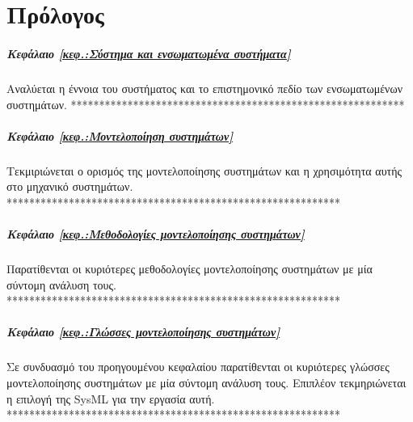 \documentclass[a4paper,12pt,twoside]{report}
\begin{document}
\pagestyle{fancy}
\fancyhf{}
\renewcommand{\chaptermark}[1]{\markboth{ \emph{#1}}{}}

\fancyhead[RE]{\leftmark}
\fancyfoot[LE,RO]{\thepage}



	\newpage
	\chapter*{Πρόλογος}
		
		\paragraph{Κεφάλαιο \ref{κεφ.:Σύστημα και ενσωματωμένα συστήματα}} {Αναλύεται η έννοια του συστήματος και το επιστημονικό πεδίο των ενσωματωμένων συστημάτων.\cite{SMSpacecraft}
		***********************************************************
		}
		\paragraph{Κεφάλαιο \ref{κεφ.:Μοντελοποίηση συστημάτων}} { Τεκμιριώνεται ο ορισμός της μοντελοποίησης συστημάτων και η χρησιμότητα αυτής στο μηχανικό συστημάτων.
		***********************************************************
		}
		\paragraph{Κεφάλαιο \ref{κεφ.:Μεθοδολογίες μοντελοποίησης συστημάτων}} {Παρατίθενται οι κυριότερες μεθοδολογίες μοντελοποίησης συστημάτων με μία σύντομη ανάλυση τους.
		***********************************************************
		}
		\paragraph{Κεφάλαιο \ref{κεφ.:Γλώσσες μοντελοποίησης συστημάτων}} {Σε συνδυασμό του προηγουμένου κεφαλαίου παρατίθενται οι κυριότερες γλώσσες  μοντελοποίησης συστημάτων με μία σύντομη ανάλυση τους. Επιπλέον τεκμηριώνεται η επιλογή της SysML για την εργασία αυτή.
		***********************************************************
		}
\end{document}
